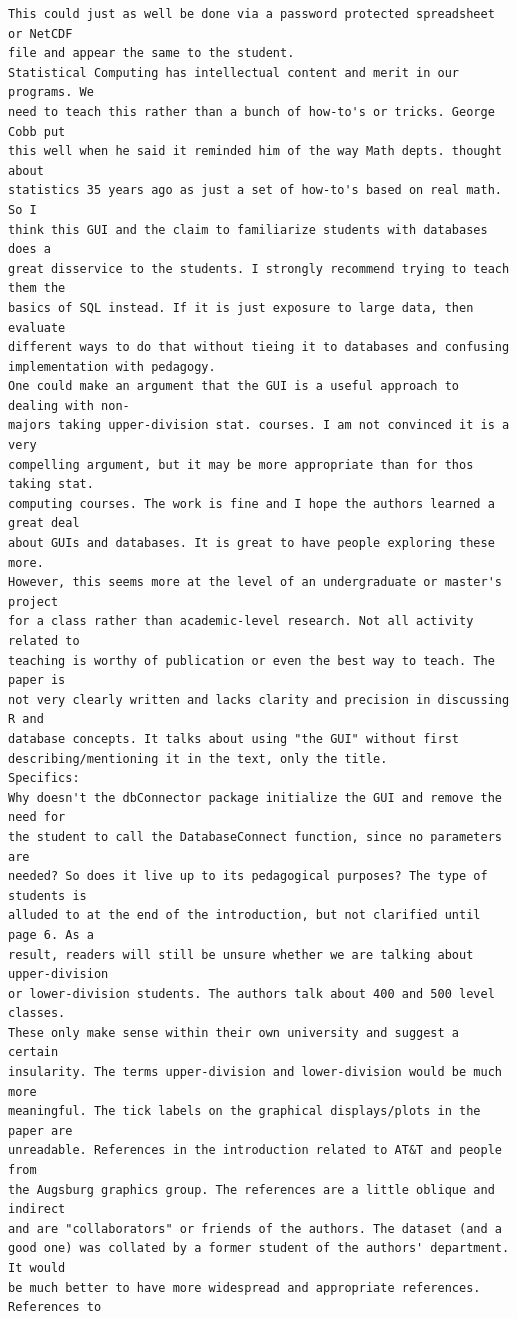 \documentclass[11pt]{tise_style}
\begin{document}
\begin{verbatim}
This could just as well be done via a password protected spreadsheet or NetCDF
file and appear the same to the student.
Statistical Computing has intellectual content and merit in our programs. We
need to teach this rather than a bunch of how-to's or tricks. George Cobb put
this well when he said it reminded him of the way Math depts. thought about
statistics 35 years ago as just a set of how-to's based on real math. So I
think this GUI and the claim to familiarize students with databases does a
great disservice to the students. I strongly recommend trying to teach them the
basics of SQL instead. If it is just exposure to large data, then evaluate
different ways to do that without tieing it to databases and confusing
implementation with pedagogy.
One could make an argument that the GUI is a useful approach to dealing with non-
majors taking upper-division stat. courses. I am not convinced it is a very
compelling argument, but it may be more appropriate than for thos taking stat.
computing courses. The work is fine and I hope the authors learned a great deal
about GUIs and databases. It is great to have people exploring these more.
However, this seems more at the level of an undergraduate or master's project
for a class rather than academic-level research. Not all activity related to
teaching is worthy of publication or even the best way to teach. The paper is
not very clearly written and lacks clarity and precision in discussing R and
database concepts. It talks about using "the GUI" without first
describing/mentioning it in the text, only the title.
Specifics:
Why doesn't the dbConnector package initialize the GUI and remove the need for
the student to call the DatabaseConnect function, since no parameters are
needed? So does it live up to its pedagogical purposes? The type of students is
alluded to at the end of the introduction, but not clarified until page 6. As a
result, readers will still be unsure whether we are talking about upper-division
or lower-division students. The authors talk about 400 and 500 level classes.
These only make sense within their own university and suggest a certain
insularity. The terms upper-division and lower-division would be much more
meaningful. The tick labels on the graphical displays/plots in the paper are
unreadable. References in the introduction related to AT&T and people from
the Augsburg graphics group. The references are a little oblique and indirect
and are "collaborators" or friends of the authors. The dataset (and a
good one) was collated by a former student of the authors' department. It would
be much better to have more widespread and appropriate references. References to

\end{verbatim}
\end{document}
